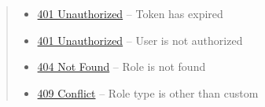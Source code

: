 \documentclass[letterpaper,10pt,english]{sphinxmanual}
\begin{document}
\begin{fulllineitems}
\begin{quote}
\begin{description}
\begin{itemize}
\item {} 
\href{http://www.w3.org/Protocols/rfc2616/rfc2616-sec10.html\#sec10.4.2}{401 Unauthorized} -- Token has expired

\item {} 
\href{http://www.w3.org/Protocols/rfc2616/rfc2616-sec10.html\#sec10.4.2}{401 Unauthorized} -- User is not authorized

\item {} 
\href{http://www.w3.org/Protocols/rfc2616/rfc2616-sec10.html\#sec10.4.5}{404 Not Found} -- Role is not found

\item {} 
\href{http://www.w3.org/Protocols/rfc2616/rfc2616-sec10.html\#sec10.4.10}{409 Conflict} -- Role type is other than custom

\end{itemize}

\end{description}\end{quote}

\end{fulllineitems}
\end{document}

